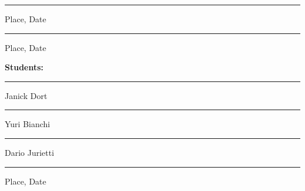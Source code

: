 \documentclass[a4paper,11pt,bibliography=totoc,listof=totoc]{scrreprt}
\begin{document}
\vspace{2.5cm}

\noindent
\begin{minipage}[t]{0.48\textwidth}
  \rule{\textwidth}{0.4pt}\par
  {\small Place, Date}
\end{minipage}\hfill
\begin{minipage}[t]{0.48\textwidth}
  \rule{\textwidth}{0.4pt}\par
  {\small Place, Date}
\end{minipage}


\vspace{2.0cm}

\textbf{Students:}
\vspace{2.5cm}


\noindent
\begin{minipage}[t]{0.48\textwidth}
  \rule{\textwidth}{0.4pt}\par
  {\small Janick Dort}
\end{minipage}\hfill
\begin{minipage}[t]{0.48\textwidth}
  \rule{\textwidth}{0.4pt}\par

  {\small Yuri Bianchi}
\end{minipage}

\vspace{2.5cm}

\noindent
\begin{minipage}[t]{0.48\textwidth}
  \rule{\textwidth}{0.4pt}\par
  {\small Dario Jurietti}
\end{minipage}\hfill
\begin{minipage}[t]{0.48\textwidth}
  \rule{\textwidth}{0.4pt}\par
  {\small Place, Date}
\end{minipage}
\end{document}
